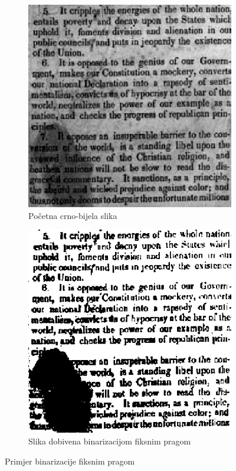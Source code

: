 \documentclass[times, utf8, zavrsni, numeric]{fer}
\begin{document}
\begin{figure}[th!]
    \centering
    \begin{subfigure}{.5\textwidth}
        \centering
        \includegraphics[width=.85\linewidth]{Images/Grayscale.png}
        \caption{Početna crno-bijela slika}
        \label{fig:sub1}
    \end{subfigure}%
    \begin{subfigure}{.5\textwidth}
        \centering
        \includegraphics[width=.85\linewidth]{Images/Threshold.png}
        \caption{Slika dobivena binarizacijom fiksnim pragom}
        \label{fig:sub2}
    \end{subfigure}
    \caption{Primjer binarizacije fiksnim pragom}
    \label{fig:threshold}
\end{figure}
\end{document}
